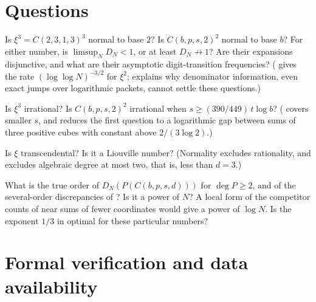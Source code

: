 \documentclass[11pt]{article}
\begin{document}
\section{Questions}\label{sec:questions}

\begin{question}\label{q:boundary}
Is $\xi^3=C(2,3,1,3)^3$ normal to base $2$? Is $C(b,p,s,2)^2$ normal to base $b$? For either number, is
$\limsup_ND_N<1$, or at least $D_N\not\to1$? Are their expansions disjunctive, and what are their asymptotic
digit-transition frequencies? ( gives the rate $(\log\log N)^{-3/2}$ for $\xi^2$;
 explains why denominator information, even exact jumps over logarithmic packets, cannot
settle these questions.)
\end{question}

\begin{question}\label{q:irrational}
Is $\xi^3$ irrational? Is $C(b,p,s,2)^2$ irrational when $s\ge(390/449)\,t\log b$? ( covers
smaller $s$, and  reduces the first question to a logarithmic gap between sums of three
positive cubes with constant above $2/(3\log2)$.)
\end{question}

\begin{question}
Is $\xi$ transcendental? Is it a Liouville number? (Normality excludes rationality, and 
excludes algebraic degree at most two, that is, less than $d=3$.)
\end{question}

\begin{question}
What is the true order of $D_N(P(C(b,p,s,d)))$ for $\deg P\ge2$, and of the several-order discrepancies of
? Is it a power of $N$? A local form of the competitor counts of
 near sums of fewer coordinates would give a power of $\log N$. Is the exponent $1/3$
in  optimal for these particular numbers?
\end{question}

\section{Formal verification and data availability}\label{sec:formal}
\end{document}
